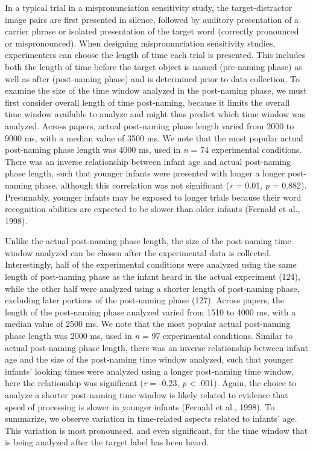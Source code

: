 \documentclass[man]{apa6}
\theoremstyle{definition}
\theoremstyle{definition}
\theoremstyle{definition}
\theoremstyle{remark}
\begin{document}
In a typical trial in a mispronunciation sensitivity study, the
target-distractor image pairs are first presented in silence, followed
by auditory presentation of a carrier phrase or isolated presentation of
the target word (correctly pronounced or mispronounced). When designing
mispronunciation sensitivity studies, experimenters can choose the
length of time each trial is presented. This includes both the length of
time before the target object is named (pre-naming phase) as well as
after (post-naming phase) and is determined prior to data collection. To
examine the size of the time window analyzed in the post-naming phase,
we must first consider overall length of time post-naming, because it
limits the overall time window available to analyze and might thus
predict which time window was analyzed. Across papers, actual
post-naming phase length varied from 2000 to 9000 ms, with a median
value of 3500 ms. We note that the most popular actual post-naming phase
length was 4000 ms, used in \emph{n} = 74 experimental conditions. There
was an inverse relationship between infant age and actual post-naming
phase length, such that younger infants were presented with longer a
longer post-naming phase, although this correlation was not significant
(\emph{r} = 0.01, \emph{p} = 0.882). Presumably, younger infants may be
exposed to longer trials because their word recognition abilities are
expected to be slower than older infants (Fernald et al., 1998).

Unlike the actual post-naming phase length, the size of the post-naming
time window analyzed can be chosen after the experimental data is
collected. Interestingly, half of the experimental conditions were
analyzed using the same length of post-naming phase as the infant heard
in the actual experiment (124), while the other half were analyzed using
a shorter length of post-naming phase, excluding later portions of the
post-naming phase (127). Across papers, the length of the post-naming
phase analyzed varied from 1510 to 4000 ms, with a median value of 2500
ms. We note that the most popular actual post-naming phase length was
2000 ms, used in \emph{n} = 97 experimental conditions. Similar to
actual post-naming phase length, there was an inverse relationship
between infant age and the size of the post-naming time window analyzed,
such that younger infants' looking times were analyzed using a longer
post-naming time window, here the relationship was significant (\emph{r}
= -0.23, \emph{p} \textless{} .001). Again, the choice to analyze a
shorter post-naming time window is likely related to evidence that speed
of processing is slower in younger infants (Fernald et al., 1998). To
summarize, we observe variation in time-related aspects related to
infants' age. This variation is most pronounced, and even significant,
for the time window that is being analyzed after the target label has
been heard.
\end{document}
